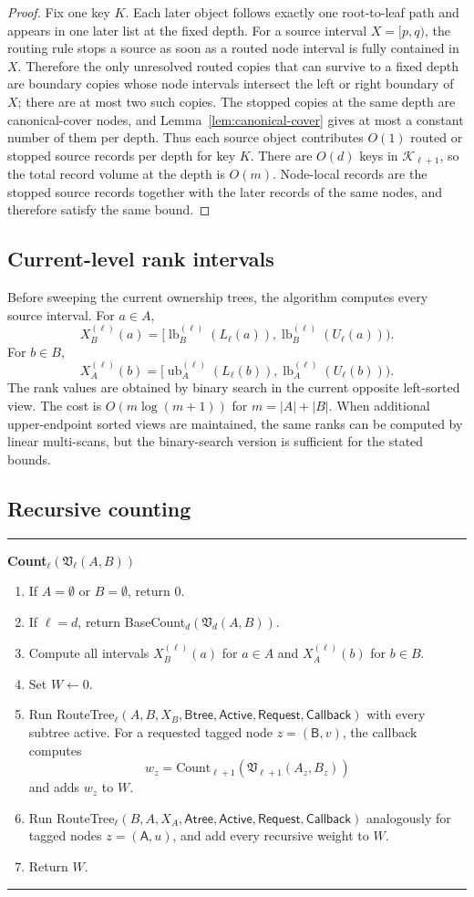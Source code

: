 \documentclass[11pt]{article}
\newcommand{\lb}{\operatorname{lb}}
\newcommand{\ub}{\operatorname{ub}}
\newcommand{\Callback}{\ensuremath{\mathsf{Callback}}}
\newcommand{\Request}{\ensuremath{\mathsf{Request}}}
\newcommand{\Active}{\ensuremath{\mathsf{Active}}}
\newcommand{\Btree}{\ensuremath{\mathsf{Btree}}}
\newcommand{\Atree}{\ensuremath{\mathsf{Atree}}}
\newcommand{\sideA}{\ensuremath{\mathsf A}}
\newcommand{\sideB}{\ensuremath{\mathsf B}}
\theoremstyle{definition}
\newenvironment{algorithmbox}[1]{%
  \par\medskip\noindent\hrule\smallskip
  \noindent\textbf{#1}\par\smallskip
  \begin{enumerate}[leftmargin=1.7em,itemsep=2pt,topsep=2pt]
}{%
  \end{enumerate}
  \smallskip\hrule\medskip
}
\begin{document}
\begin{proof}
Fix one key $K$.  Each later object follows exactly one root-to-leaf path and appears in one later list at the fixed depth.  For a source interval $X=[p,q)$, the routing rule stops a source as soon as a routed node interval is fully contained in $X$.  Therefore the only unresolved routed copies that can survive to a fixed depth are boundary copies whose node intervals intersect the left or right boundary of $X$; there are at most two such copies.  The stopped copies at the same depth are canonical-cover nodes, and Lemma~\ref{lem:canonical-cover} gives at most a constant number of them per depth.  Thus each source object contributes $O(1)$ routed or stopped source records per depth for key $K$.  There are $O(d)$ keys in $\mathcal K_{\ell+1}$, so the total record volume at the depth is $O(m)$.  Node-local records are the stopped source records together with the later records of the same nodes, and therefore satisfy the same bound.
\end{proof}

\subsection{Current-level rank intervals}

Before sweeping the current ownership trees, the algorithm computes every source interval.  For $a\in A$,
\[
  X_B^{(\ell)}(a)=
  [\lb_B^{(\ell)}(L_\ell(a)),\lb_B^{(\ell)}(U_\ell(a))).
\]
For $b\in B$,
\[
  X_A^{(\ell)}(b)=
  [\ub_A^{(\ell)}(L_\ell(b)),\lb_A^{(\ell)}(U_\ell(b))).
\]
The rank values are obtained by binary search in the current opposite left-sorted view.  The cost is $O(m\log(m+1))$ for $m=|A|+|B|$.  When additional upper-endpoint sorted views are maintained, the same ranks can be computed by linear multi-scans, but the binary-search version is sufficient for the stated bounds.

\subsection{Recursive counting}

\begin{algorithmbox}{Count$_\ell(\mathfrak V_\ell(A,B))$}
\item If $A=\emptyset$ or $B=\emptyset$, return $0$.
\item If $\ell=d$, return BaseCount$_d(\mathfrak V_d(A,B))$.
\item Compute all intervals $X_B^{(\ell)}(a)$ for $a\in A$ and $X_A^{(\ell)}(b)$ for $b\in B$.
\item Set $W\leftarrow0$.
\item Run RouteTree$_\ell(A,B,X_B,\Btree,\Active,\Request,\Callback)$ with every subtree active.  For a requested tagged node $z=(\sideB,v)$, the callback computes
\[
  w_z=\mathrm{Count}_{\ell+1}(\mathfrak V_{\ell+1}(A_z,B_z))
\]
and adds $w_z$ to $W$.
\item Run RouteTree$_\ell(B,A,X_A,\Atree,\Active,\Request,\Callback)$ analogously for tagged nodes $z=(\sideA,u)$, and add every recursive weight to $W$.
\item Return $W$.
\end{algorithmbox}
\end{document}
